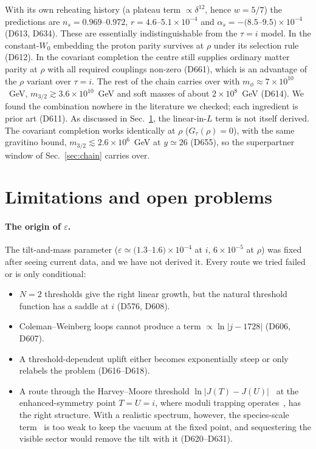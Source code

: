 \documentclass[aps,prd,twocolumn,superscriptaddress,nofootinbib,floatfix]{revtex4-2}
\begin{document}
With its own reheating history (a plateau term $\propto\delta^{12}$, hence $w = 5/7$) the predictions are $n_s = 0.969$--$0.972$, $r = 4.6$--$5.1\times10^{-4}$ and $\alpha_s = -(8.5$--$9.5)\times10^{-4}$ (D613, D634). These are essentially indistinguishable from the $\tau = i$ model. In the constant-$W_0$ embedding the proton parity survives at $\rho$ under its selection rule (D612). In the covariant completion the centre still supplies ordinary matter parity at $\rho$ with all required couplings non-zero (D661), which is an advantage of the $\rho$ variant over $\tau=i$. The rest of the chain carries over with $m_\phi \approx 7\times10^{10}$~GeV, $m_{3/2} \gtrsim 3.6\times10^{10}$~GeV and soft masses of about $2\times10^8$~GeV (D614). We found the combination nowhere in the literature we checked; each ingredient is prior art (D611). As discussed in Sec.~\ref{sec:limits}, the linear-in-$L$ term is not itself derived. The covariant completion works identically at $\rho$ ($G_\tau(\rho)=0$), with the same gravitino bound, $m_{3/2}\lesssim2.6\times10^6$~GeV at $y\simeq26$ (D655), so the superpartner window of Sec.~\ref{sec:chain} carries over.

\section{Limitations and open problems}\label{sec:limits}
\paragraph{The origin of $\varepsilon$.} The tilt-and-mass parameter ($\varepsilon \simeq (1.3$--$1.6)\times10^{-4}$ at $i$, $6\times10^{-5}$ at $\rho$) was fixed after seeing current data, and we have not derived it. Every route we tried failed or is only conditional:
\begin{itemize}
\item $N=2$ thresholds give the right linear growth, but the natural threshold function has a saddle at $i$ (D576, D608).
\item Coleman--Weinberg loops cannot produce a term $\propto\ln|j-1728|$ (D606, D607).
\item A threshold-dependent uplift either becomes exponentially steep or only relabels the problem (D616--D618).
\item A route through the Harvey--Moore threshold $\ln|J(T)-J(U)|$~\cite{arXiv_hep-th_9510182} at the enhanced-symmetry point $T = U = i$, where moduli trapping operates~\cite{arXiv_hep-th_0403001}, has the right structure. With a realistic spectrum, however, the species-scale term~\cite{arXiv_2507_05345} is too weak to keep the vacuum at the fixed point, and sequestering the visible sector would remove the tilt with it (D620--D631).
\end{itemize}
\end{document}
